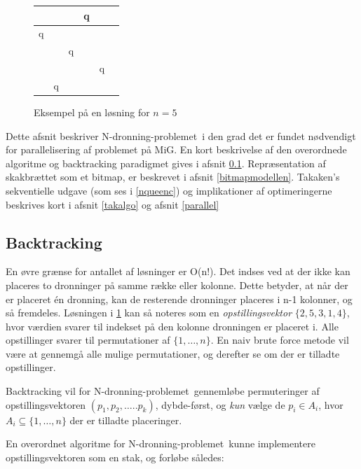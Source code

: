 \documentclass[draft,a4paper,11pt]{article}
\newcommand{\mig}{MiG}
\newcommand{\nq}{N-dronning-problemet}
\def\chs#1{{\chessfont#1}}
\begin{document}
\begin{figure}
\begin{center}
\begin{tabular}{|c|c|c|c|c|c}
\hline	 &  & &   \chs{q} & \\
\hline	\chs{q} & &  &  & \\
\hline	 & & \chs{q} &  &  \\
\hline	 &  &  & & \chs{q} \\
\hline	 & \chs{q} & &  &  \\
\hline
\end{tabular}
\end{center}
\caption{Eksempel på en løsning for $n=5$}
\label{fig:nq5eks}
\end{figure}

Dette afsnit beskriver \nq\ i den grad det er fundet nødvendigt for parallelisering af problemet på \mig. En kort beskrivelse af den overordnede algoritme og backtracking paradigmet gives i afsnit \ref{backtracking}. Repræsentation af skakbrættet som et bitmap, er beskrevet i afsnit \ref{bitmapmodellen}. Takaken's sekventielle udgave (som ses i \ref{nqueenc}) og implikationer af optimeringerne beskrives kort i afsnit \ref{takalgo} og afsnit \ref{parallel}


\subsection{Backtracking}\label{backtracking}

En øvre grænse for antallet af løsninger er O(n!). Det indses ved at der ikke kan placeres to dronninger på samme række eller kolonne. Dette betyder, at når der er placeret én dronning, kan de resterende dronninger placeres i n-1 kolonner, og så fremdeles. Løsningen i \ref{fig:nq5eks} kan så noteres som en \emph{opstillingsvektor} $\{2,5,3,1,4\}$, hvor værdien svarer til indekset på den kolonne dronningen er placeret i. Alle opstillinger svarer til permutationer af $\{1,\ldots,n\}$. En naiv brute force metode vil være at gennemgå alle mulige permutationer, og derefter se om der er tilladte opstillinger.

Backtracking vil for \nq\ gennemløbe permuteringer af opstillingsvektoren  $(p_1,p_2,\ldots..p_k)$, dybde-først, og \emph{kun} vælge de $p_i \in A_i$, hvor $A_i\subseteq \{1,\ldots,n\}$ der er tilladte placeringer. 

En overordnet algoritme for \nq\ kunne implementere opstillingsvektoren som en stak, og forløbe således:
\end{document}
